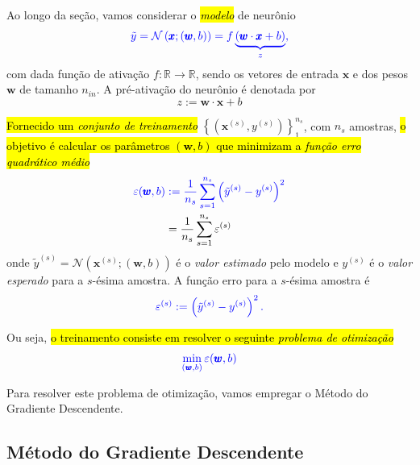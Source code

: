 Ao longo da seção, vamos considerar o \hl{\emph{modelo}} de neurônio
\begin{equation}
  \color{blue}\tilde{y} = \mathcal{N}\left(\pmb{x}; (\pmb{w}, b)\right) = f\underbrace{(\pmb{w}\cdot\pmb{x} + b)}_{z},
\end{equation}
com dada função de ativação $f:\mathbb{R}\to\mathbb{R}$, sendo os vetores de entrada $\pmb{x}$ e dos pesos $\pmb{w}$ de tamanho $n_{in}$. A pré-ativação do neurônio é denotada por
\begin{equation}
  z := \pmb{w}\cdot\pmb{x} + b
\end{equation}

\hl{Fornecido um \emph{conjunto de treinamento}} $\left\{\left(\pmb{x}^{(s)}, y^{(s)}\right)\right\}_1^{n_s}$, com $n_s$ amostras, \hl{o objetivo é calcular os parâmetros $(\pmb{w}, b)$ que minimizam a \emph{função erro quadrático médio}}
\begin{align}\label{eq:percep_mse}
  \color{blue}\varepsilon(\pmb{w}, b) &\color{blue}:= \frac{1}{n_s}\sum_{s=1}^{n_s}\left(\tilde{y}^{(s)} - y^{(s)}\right)^2\\
                          &= \frac{1}{n_s}\sum_{s=1}^{n_s}\varepsilon^{(s)}
\end{align}
onde $\tilde{y}^{(s)} = \mathcal{N}\left(\pmb{x}^{(s)}; (\pmb{w}, b)\right)$ é o \emph{valor estimado} pelo modelo e $y^{(s)}$ é o \emph{valor esperado} para a $s$-ésima amostra. A função erro para a $s$-ésima amostra é
\begin{equation}\color{blue}\varepsilon^{(s)} := \left(\tilde{y}^{(s)} - y^{(s)}\right)^2.
\end{equation}

Ou seja, \hl{o treinamento consiste em resolver o seguinte \emph{problema de otimização}}
\begin{equation}\color{blue}\min_{(\pmb{w}, b)}\varepsilon(\pmb{w}, b)
\end{equation}

Para resolver este problema de otimização, vamos empregar o Método do Gradiente Descendente.

\subsection{Método do Gradiente Descendente}

